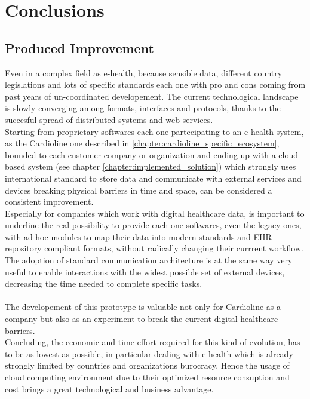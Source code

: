 \chapter{Conclusions}
\section{Produced Improvement}
Even in a complex field as e-health, because sensible data, different country legislations and lots of specific standards each one with pro and cons coming from past years of un-coordinated developement. The current technological landscape is slowly converging among formats, interfaces and protocols, thanks to the succesful spread of distributed systems and web services.\\
Starting from proprietary softwares each one partecipating to an e-health system, as the Cardioline one described in \ref{chapter:cardioline_specific_ecosystem}, bounded to each customer company or organization and ending up with a cloud based system (see chapter \ref{chapter:implemented_solution}) which strongly uses international standard to store data and communicate with external services and devices breaking physical barriers in time and space, can be considered a consistent improvement.\\
Especially for companies which work with digital healthcare data, is important to underline the real possibility to provide each one softwares, even the legacy ones, with ad hoc modules to map their data into modern standards and EHR repository compliant formats, without radically changing their currrent workflow.
The adoption of standard communication architecture is at the same way very useful to enable interactions with the widest possible set of external devices, decreasing the time needed to complete specific tasks.\\ \\
The developement of this prototype is valuable not only for Cardioline as a company but also as an experiment to break the current digital healthcare barriers.\\
Concluding, the economic and time effort required for this kind of evolution, has to be as lowest as possible, in particular dealing with e-health which is already strongly limited by countries and organizations burocracy. Hence the usage of cloud computing environment due to their optimized resource consuption and cost brings a great technological and business advantage.

